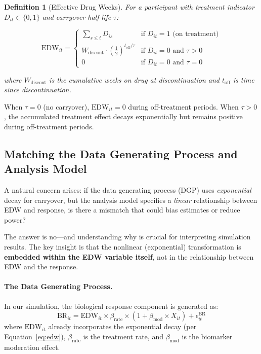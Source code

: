 \documentclass[11pt,letterpaper]{article}
\newtheorem{definition}{Definition}
\begin{document}
\begin{definition}[Effective Drug Weeks]
For a participant with treatment indicator $D_{it} \in \{0, 1\}$ and carryover
half-life $\tau$:

\begin{equation}
\text{EDW}_{it} =
\begin{cases}
\sum_{s \leq t} D_{is} & \text{if } D_{it} = 1 \text{ (on treatment)} \\[8pt]
W_{\text{discont}} \cdot \left(\frac{1}{2}\right)^{t_{\text{off}}/\tau} &
\text{if } D_{it} = 0 \text{ and } \tau > 0 \\[8pt]
0 & \text{if } D_{it} = 0 \text{ and } \tau = 0
\end{cases}
\label{eq:edw}
\end{equation}

where $W_{\text{discont}}$ is the cumulative weeks on drug at discontinuation
and $t_{\text{off}}$ is time since discontinuation.
\end{definition}

When $\tau = 0$ (no carryover), $\text{EDW}_{it} = 0$ during off-treatment
periods. When $\tau > 0$, the accumulated treatment effect decays
exponentially but remains positive during off-treatment periods.

\subsection{Matching the Data Generating Process and Analysis Model}

A natural concern arises: if the data generating process (DGP) uses
\emph{exponential} decay for carryover, but the analysis model specifies a
\emph{linear} relationship between EDW and response, is there a mismatch that
could bias estimates or reduce power?

The answer is no---and understanding why is crucial for interpreting simulation
results. The key insight is that the nonlinear (exponential) transformation is
\textbf{embedded within the EDW variable itself}, not in the relationship
between EDW and the response.

\paragraph{The Data Generating Process.}
In our simulation, the biological response component is generated as:
\begin{equation}
\text{BR}_{it} = \text{EDW}_{it} \times \beta_{\text{rate}} \times
(1 + \beta_{\text{mod}} \times X_{it}) + \epsilon^{\text{BR}}_{it}
\label{eq:dgp_br}
\end{equation}
where $\text{EDW}_{it}$ already incorporates the exponential decay (per
Equation~\ref{eq:edw}), $\beta_{\text{rate}}$ is the treatment rate, and
$\beta_{\text{mod}}$ is the biomarker moderation effect.
\end{document}
